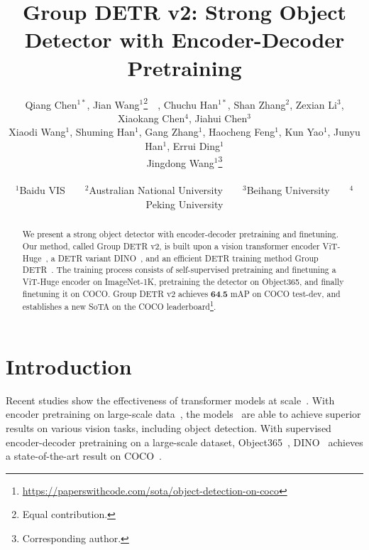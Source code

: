 \documentclass[10pt,twocolumn,letterpaper]{article}
\begin{document}
\title{Group DETR v2: Strong Object Detector with Encoder-Decoder Pretraining}
\author{
Qiang Chen$^{1*}$, Jian Wang$^{1}$\thanks{Equal contribution.}~~, Chuchu Han$^{1*}$, Shan Zhang$^2$, Zexian Li$^3$, Xiaokang Chen$^4$, Jiahui Chen$^3$ \\ Xiaodi Wang$^1$, Shuming Han$^1$, Gang Zhang$^1$, Haocheng Feng$^1$, Kun Yao$^1$, Junyu Han$^1$, Errui Ding$^1$\\ Jingdong Wang$^1$\thanks{Corresponding author.} \\
\\
$^1$Baidu VIS~~~~$^2$Australian National University~~~~$^3$Beihang University~~~~$^4$Peking University\\
}

\maketitle

\begin{abstract} 
We present a strong object detector with 
encoder-decoder pretraining and finetuning. 
Our method, called Group DETR v2, is built upon a vision transformer encoder ViT-Huge~\cite{dosovitskiy2020image}, 
a DETR variant DINO~\cite{zhang2022dino}, and an efficient DETR training method 
Group DETR~\cite{chen2022group}. 
The training process consists of self-supervised pretraining and finetuning a ViT-Huge encoder on ImageNet-1K, 
pretraining the detector on Object365, 
and finally finetuning it on COCO. 
Group DETR v2 achieves $\textbf{64.5}$ mAP on COCO test-dev, and
establishes a new SoTA on the COCO leaderboard\footnote{\url{https://paperswithcode.com/sota/object-detection-on-coco}}.
\end{abstract}


\section{Introduction} \label{sec:intro}

Recent studies show the effectiveness of transformer models at scale~\cite{dosovitskiy2020image,zhai2022scaling,liu2022swin}.
With encoder pretraining on large-scale data~\cite{deng2009imagenet,ridnik2021imagenet}, the models~\cite{bao2021beit,he2022masked,xie2022simmim,chen2022context,peng2022beit,wang2022image} are able to achieve superior results 
on various vision tasks, including object detection. 
With supervised encoder-decoder pretraining on a large-scale dataset, Object365~\cite{shao2019objects365}, DINO~\cite{zhang2022dino} achieves a state-of-the-art result on COCO~\cite{lin2014microsoft}.
\end{document}
